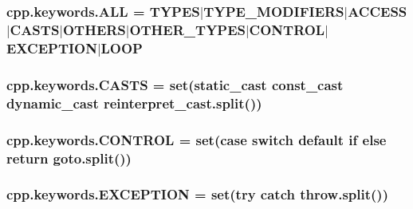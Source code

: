 \subsubsection[{\texorpdfstring{A\+LL}{ALL}}]{\setlength{\rightskip}{0pt plus 5cm}cpp.\+keywords.\+A\+LL = {\bf T\+Y\+P\+ES}$\vert${\bf T\+Y\+P\+E\+\_\+\+M\+O\+D\+I\+F\+I\+E\+RS}$\vert${\bf A\+C\+C\+E\+SS}$\vert${\bf C\+A\+S\+TS}$\vert${\bf O\+T\+H\+E\+RS}$\vert${\bf O\+T\+H\+E\+R\+\_\+\+T\+Y\+P\+ES}$\vert${\bf C\+O\+N\+T\+R\+OL}$\vert${\bf E\+X\+C\+E\+P\+T\+I\+ON}$\vert${\bf L\+O\+OP}}\hypertarget{namespacecpp_1_1keywords_a2e8727b78fb9434c99ac8518c6dd1ecc}{}\label{namespacecpp_1_1keywords_a2e8727b78fb9434c99ac8518c6dd1ecc}
\subsubsection[{\texorpdfstring{C\+A\+S\+TS}{CASTS}}]{\setlength{\rightskip}{0pt plus 5cm}cpp.\+keywords.\+C\+A\+S\+TS = {\bf set}(\textquotesingle{}static\+\_\+cast const\+\_\+cast dynamic\+\_\+cast reinterpret\+\_\+cast\textquotesingle{}.split())}\hypertarget{namespacecpp_1_1keywords_aeba38dc38e188040f4ec44ba05092e7f}{}\label{namespacecpp_1_1keywords_aeba38dc38e188040f4ec44ba05092e7f}
\subsubsection[{\texorpdfstring{C\+O\+N\+T\+R\+OL}{CONTROL}}]{\setlength{\rightskip}{0pt plus 5cm}cpp.\+keywords.\+C\+O\+N\+T\+R\+OL = {\bf set}(\textquotesingle{}case switch default if else return goto\textquotesingle{}.split())}\hypertarget{namespacecpp_1_1keywords_a374dfe9c96681079802ba4724287b8ff}{}\label{namespacecpp_1_1keywords_a374dfe9c96681079802ba4724287b8ff}
\subsubsection[{\texorpdfstring{E\+X\+C\+E\+P\+T\+I\+ON}{EXCEPTION}}]{\setlength{\rightskip}{0pt plus 5cm}cpp.\+keywords.\+E\+X\+C\+E\+P\+T\+I\+ON = {\bf set}(\textquotesingle{}try catch throw\textquotesingle{}.split())}\hypertarget{namespacecpp_1_1keywords_a2665fb8a25a4dae03fa5d3dc975c537c}{}\label{namespacecpp_1_1keywords_a2665fb8a25a4dae03fa5d3dc975c537c}
